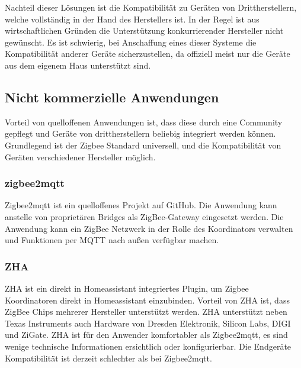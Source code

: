 Nachteil dieser Lösungen ist die Kompatibilität zu Geräten von Drittherstellern, welche vollständig in der Hand des Herstellers ist. In der Regel ist aus
wirtschaftlichen Gründen die Unterstützung konkurrierender Hersteller nicht gewünscht. Es ist schwierig, bei Anschaffung eines dieser Systeme die Kompatibilität
anderer Geräte sicherzustellen, da offiziell meist nur die Geräte aus dem eigenem Haus unterstützt sind.

\subsection{Nicht kommerzielle Anwendungen}

Vorteil von quelloffenen Anwendungen ist, dass diese durch eine Community gepflegt und Geräte von drittherstellern beliebig integriert werden können.
Grundlegend ist der Zigbee Standard universell, und die Kompatibilität von Geräten verschiedener Hersteller möglich.

\subsubsection{zigbee2mqtt}

Zigbee2mqtt \cite{z2m} ist ein quelloffenes Projekt auf GitHub. Die Anwendung kann anstelle von proprietären Bridges als ZigBee-Gateway
eingesetzt werden. Die Anwendung kann ein ZigBee Netzwerk in der Rolle des Koordinators verwalten und Funktionen per MQTT nach außen verfügbar machen.

\subsubsection{ZHA}
ZHA ist ein direkt in Homeassistant integriertes Plugin, um Zigbee Koordinatoren direkt in Homeassistant einzubinden. Vorteil
von ZHA ist, dass ZigBee Chips mehrerer Hersteller unterstützt werden. ZHA unterstützt neben Texas Instruments auch Hardware von Dresden Elektronik,
Silicon Labs, DIGI und ZiGate. ZHA ist für den Anwender komfortabler als Zigbee2mqtt, es sind wenige technische Informationen ersichtlich oder konfigurierbar.
Die Endgeräte Kompatibilität ist derzeit schlechter als bei Zigbee2mqtt.







